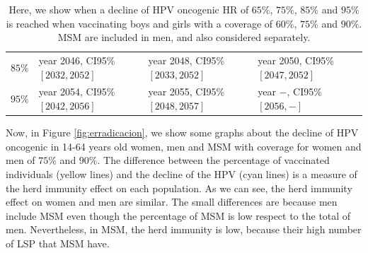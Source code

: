 \begin{table}
\begin{tabular}{c|lll}
$ 85 \%$ & year 2046, CI95\% $[ 2032 , 2052 ]$ & year 2048, CI95\% $[ 2033 , 2052 ]$ & year 2050, CI95\% $[ 2047 , 2052 ]$ \\
$ 95 \%$ & year 2054, CI95\% $[ 2042 , 2056 ]$ & year 2055, CI95\% $[ 2048 , 2057 ]$ & year $-$, CI95\% $[ 2056 , - ]$
	\end{tabular} 
	\caption{Here, we show when a decline of HPV oncogenic HR of $65\%$, $75\%$, $85\%$ and $95\%$ is reached when vaccinating boys and girls with a coverage of $60\%$, $75\%$ and $90\%$. MSM are included in men, and also considered separately.}
	\label{tabla:decline_HR_onco}
\end{table}

Now, in Figure \ref{fig:erradicacion}, we show some graphs about the decline of HPV oncogenic in 14-64 years old women, men and MSM with coverage for women and men of $75\%$ and $90\%$. The difference between the percentage of vaccinated individuals (yellow lines) and the decline of the HPV (cyan lines) is a measure of the herd immunity effect on each population. As we can see, the herd immunity effect on women and men are similar. The small differences are because men include MSM even though the percentage of MSM is low respect to the total of men. Nevertheless, in MSM, the herd immunity is low, because their high number of LSP that MSM have.  

